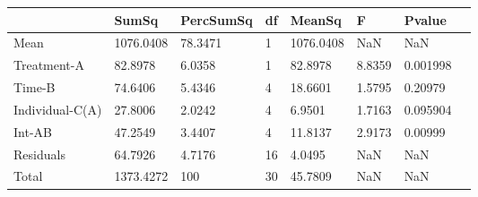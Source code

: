 \begin{table} 
\begin{tabular}{llllllll}
 & SumSq & PercSumSq & df & MeanSq & F & Pvalue \\ 
 \hline 
Mean & 1076.0408 & 78.3471 & 1 & 1076.0408 & NaN & NaN \\ 
Treatment-A & 82.8978 & 6.0358 & 1 & 82.8978 & 8.8359 & 0.001998 \\ 
Time-B & 74.6406 & 5.4346 & 4 & 18.6601 & 1.5795 & 0.20979 \\ 
Individual-C(A) & 27.8006 & 2.0242 & 4 & 6.9501 & 1.7163 & 0.095904 \\ 
Int-AB & 47.2549 & 3.4407 & 4 & 11.8137 & 2.9173 & 0.00999 \\ 
Residuals & 64.7926 & 4.7176 & 16 & 4.0495 & NaN & NaN \\ 
Total & 1373.4272 & 100 & 30 & 45.7809 & NaN & NaN \\ 
\end{tabular} 
\end{table} 

